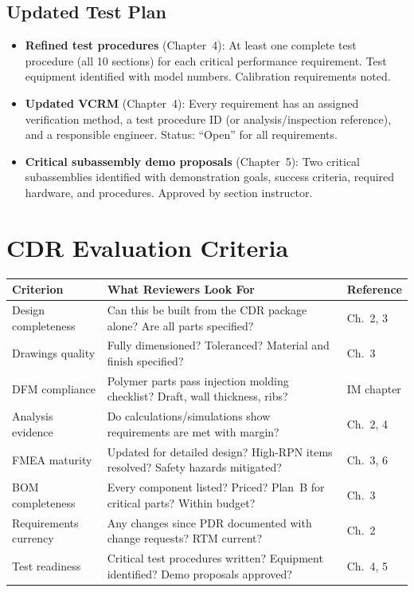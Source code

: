 \documentclass[11pt,letterpaper,twoside,openany]{book}
\begin{document}
\subsection{Updated Test Plan}

\begin{itemize}[leftmargin=1.5em]
\item \textbf{Refined test procedures} (Chapter~4): At least one complete test procedure (all 10 sections) for each critical performance requirement. Test equipment identified with model numbers. Calibration requirements noted.
\item \textbf{Updated VCRM} (Chapter~4): Every requirement has an assigned verification method, a test procedure ID (or analysis/inspection reference), and a responsible engineer. Status: ``Open'' for all requirements.
\item \textbf{Critical subassembly demo proposals} (Chapter~5): Two critical subassemblies identified with demonstration goals, success criteria, required hardware, and procedures. Approved by section instructor.
\end{itemize}

\FloatBarrier
\section{CDR Evaluation Criteria}

\begin{center}
\small
\begin{tabularx}{\textwidth}{l X l}
\toprule
\textbf{Criterion} & \textbf{What Reviewers Look For} & \textbf{Reference} \\
\midrule
Design completeness & Can this be built from the CDR package alone? Are all parts specified? & Ch.~2, 3 \\
Drawings quality & Fully dimensioned? Toleranced? Material and finish specified? & Ch.~3 \\
DFM compliance & Polymer parts pass injection molding checklist? Draft, wall thickness, ribs? & IM chapter \\
Analysis evidence & Do calculations/simulations show requirements are met with margin? & Ch.~2, 4 \\
FMEA maturity & Updated for detailed design? High-RPN items resolved? Safety hazards mitigated? & Ch.~3, 6 \\
BOM completeness & Every component listed? Priced? Plan~B for critical parts? Within budget? & Ch.~3 \\
Requirements currency & Any changes since PDR documented with change requests? RTM current? & Ch.~2 \\
Test readiness & Critical test procedures written? Equipment identified? Demo proposals approved? & Ch.~4, 5 \\
\bottomrule
\end{tabularx}
\end{center}
\end{document}
